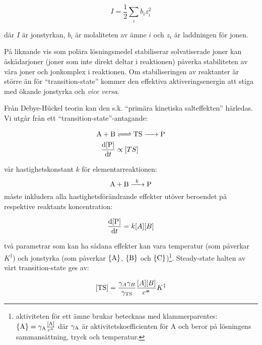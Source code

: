 \begin{equation}
  \label{eq:ionic-strength}
  I = \frac{1}{2}\sum_i b_iz_i^2
\end{equation}

där $I$ är jonstyrkan, $b_i$ är molaliteten av ämne $i$ och $z_i$ är
laddningen för jonen.

På liknande vis som polära lösningsmedel stabiliserar
solvatiserade joner kan åskådarjoner (joner som inte
direkt deltar i reaktionen) påverka stabiliteten av våra joner och
jonkomplex i reaktionen. Om stabiliseringen av reaktanter är större än
för ``transition-state'' kommer den effektiva aktiveringsenergin att
stiga med ökande jonstyrka och \emph{vice versa}.

Från Debye-Hückel teorin kan den s.k. ``primära kinetiska
salteffekten'' härledas. Vi utgår från ett ``transition-state''-antagande:

\begin{align}
  \label{eq:ts}
  \ce{A + B} & \ce{<=> TS -> P} \\
  \label{eq:dpdt-propto}
  \frac{\mathrm{d}[\ce{P}]}{\mathrm{d}t} &\propto [TS]
\end{align}

vår hastighetskonstant $k$ för elementarreaktionen:
\begin{equation}
  \ce{A + B ->[k] P}
\end{equation}
måste inkludera alla hastighetsförändrande effekter utöver beroendet på
respektive reaktants koncentration:

\begin{equation}
  \label{eq:dpdt-explicit}
  \frac{\mathrm{d}[\ce{P}]}{\mathrm{d}t} = k[A][B]
\end{equation}

två parametrar som kan ha sådana effekter kan vara temperatur (som
påverkar $K^\ddagger$) och jonstyrka (som påverkar $\left\{\ce{A}\right\}$,
$\left\{\ce{B}\right\}$ och $\left\{\ce{C}\right\}$)\footnote{
  aktiviteten för ett ämne brukar betecknas med klammerparentes:
  $\left\{\ce{A}\right\} = \gamma_{\ce{A}}\frac{\left[\ce{A}\right]}{c^\plimsoll} $
  där $\gamma_{\ce{A}}$ är aktivitetskoefficienten för A och beror på
  lösningens sammansättning, tryck och temperatur.
}. Steady-state
halten av vårt transition-state ges av:

\begin{equation}
  \label{eq:ts-conc}
  [\ce{TS}] = \frac{\gamma_A\gamma_B}{\gamma_{\ce{TS}}}\frac{[A][B]}{c^\plimsoll}K^\ddagger
\end{equation}

